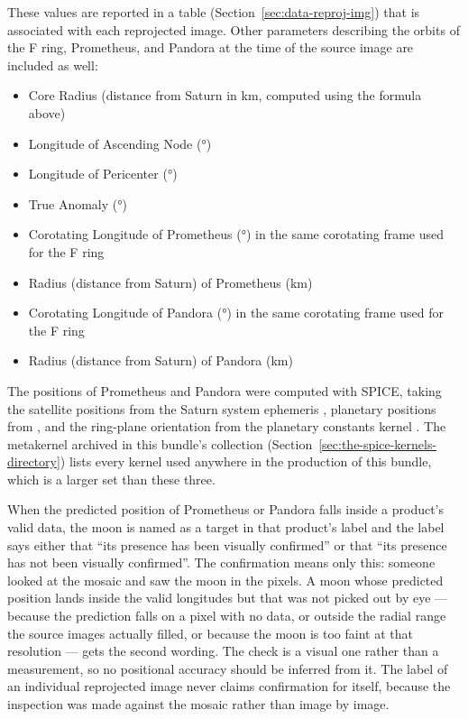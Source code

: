 These values are reported in a table  (Section~\ref{sec:data-reproj-img}) that is associated with each reprojected image. Other parameters describing the orbits of the F ring, Prometheus, and Pandora at the time of the source image are included as well:

\begin{itemize}
\item Core Radius (distance from Saturn in km, computed using the formula above)
\item Longitude of Ascending Node (°)
\item Longitude of Pericenter (°)
\item True Anomaly (°)
\item Corotating Longitude of Prometheus (°) in the same corotating frame used for the F ring
\item Radius (distance from Saturn) of Prometheus (km)
\item Corotating Longitude of Pandora (°) in the same corotating frame used for the F ring
\item Radius (distance from Saturn) of Pandora (km)
\end{itemize}
The positions of Prometheus and Pandora were computed with SPICE, taking the satellite positions from the Saturn system ephemeris , planetary positions from , and the ring-plane orientation from the planetary constants kernel . The metakernel archived in this bundle’s  collection (Section~\ref{sec:the-spice-kernels-directory}) lists every kernel used anywhere in the production of this bundle, which is a larger set than these three.

When the predicted position of Prometheus or Pandora falls inside a product’s valid data, the moon is named as a target in that product’s label and the label says either that “its presence has been visually confirmed” or that “its presence has not been visually confirmed”. The confirmation means only this: someone looked at the mosaic and saw the moon in the pixels. A moon whose predicted position lands inside the valid longitudes but that was not picked out by eye — because the prediction falls on a pixel with no data, or outside the radial range the source images actually filled, or because the moon is too faint at that resolution — gets the second wording. The check is a visual one rather than a measurement, so no positional accuracy should be inferred from it. The label of an individual reprojected image never claims confirmation for itself, because the inspection was made against the mosaic rather than image by image.

